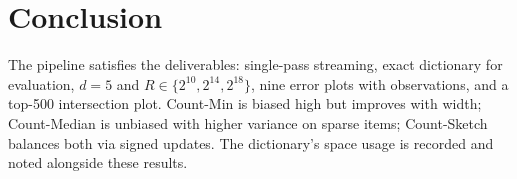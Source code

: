 \documentclass[11pt]{article}
\begin{document}
\section{Conclusion}
The pipeline satisfies the deliverables: single-pass streaming, exact dictionary for evaluation, $d{=}5$ and $R\in\{2^{10},2^{14},2^{18}\}$, nine error plots with observations, and a top-500 intersection plot. Count-Min is biased high but improves with width; Count-Median is unbiased with higher variance on sparse items; Count-Sketch balances both via signed updates. The dictionary's space usage is recorded and noted alongside these results.
\end{document}
